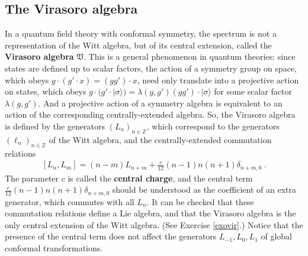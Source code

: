 \documentclass[12pt, a4paper, notitlepage, twoside]{report}
\numberwithin{equation}{section}
\theoremstyle{break}
\begin{document}
\subsection{The Virasoro algebra \label{secvir}}

In a quantum field theory with conformal symmetry, the spectrum is not a representation of the Witt algebra, but of 
its central extension, called the \textbf{\boldmath Virasoro algebra} $\mathfrak{V}$.
This is a general phenomenon in quantum theories: since states are defined up to scalar factors, the action of a symmetry group on space, which obeys $g\cdot(g'\cdot x) = (gg')\cdot x$, need only translate into a projective action on states, which obeys $g\cdot(g'\cdot|\sigma\rangle) = \lambda(g,g') (gg')\cdot |\sigma\rangle$ for some scalar factor $\lambda(g,g')$. 
And a projective action of a symmetry algebra is equivalent to an action of the corresponding centrally-extended algebra. 
So, the Virasoro algebra is defined by the generators $(L_n)_{n\in {\mathbb{Z}}}$, which correspond to the generators $(\ell_n)_{n\in \mathbb{Z}}$ of the Witt algebra, and the centrally-extended commutation relations
\begin{align}
 \boxed{[L_n,L_m]=(n-m)L_{n+m} + \frac{c}{12} (n-1)n(n+1) \delta_{n+m,0}}\ .
\label{vir}
\end{align}
The parameter $c$ is called the \textbf{\boldmath central charge}, and the central term $\frac{c}{12} (n-1)n(n+1) \delta_{n+m,0}$ should be understood as the coefficient of an extra generator, which commutes with all $L_n$.
It can be checked that these commutation relations define a Lie algebra, and that the Virasoro algebra is the only central extension of the Witt algebra. (See Exercise \ref{exovir}.) Notice that the presence of the central term does not affect the generators $L_{-1},L_0,L_1$ of global conformal transformations. 
\end{document}
